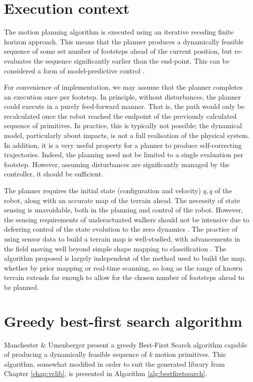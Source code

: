 \section{Execution context}
The motion planning algorithm is executed using an iterative receding finite horizon approach. This means that the planner produces a dynamically feasible sequence of some set number of footsteps ahead of the current position, but re-evaluates the sequence significantly earlier than the end-point. This can be considered a form of model-predictive control \cite{camacho2013model}.

For convenience of implementation, we may assume that the planner completes an execution once per footstep. In principle, without disturbances, the planner could execute in a purely feed-forward manner. That is, the path would only be recalculated once the robot reached the endpoint of the previously calculated sequence of primitives. In practice, this is typically not possible; the dynamical model, particularly about impacts, is not a full realisation of the physical system. In addition, it is a very useful property for a planner to produce self-correcting trajectories. Indeed, the planning need not be limited to a single evaluation per footstep. However, assuming disturbances are significantly managed by the controller, it should be sufficient.

The planner requires the initial state (configuration and velocity) $q,\dot{q}$ of the robot, along with an accurate map of the terrain ahead. The necessity of state sensing is unavoidable, both in the planning and control of the robot. However, the sensing requirements of underactuated walkers should not be intensive due to deferring control of the state evolution to the zero dynamics \cite{collins2005efficient}. The practice of using sensor data to build a terrain map is well-studied, with advancements in the field moving well beyond simple shape mapping to classification \cite{herbert1989terrain, triebel2006multi, brooks2007self}. The algorithm proposed is largely independent of the method used to build the map, whether by prior mapping or real-time scanning, so long as the range of known terrain extends far enough to allow for the chosen number of footsteps ahead to be planned.

\section{Greedy best-first search algorithm}
Manchester \& Umenberger \cite{manchester13planning} present a greedy Best-First Search algorithm capable of producing a dynamically feasible sequence of $k$ motion primitives. This algorithm, somewhat modified in order to suit the generated library from Chapter \ref{chap:vclib}, is presented in Algorithm \ref{alg:bestfirstsearch}.

